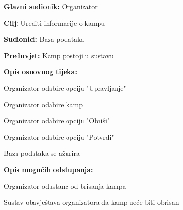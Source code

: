 					\noindent {}
					\begin{packed_item}
						
						\item \textbf{Glavni sudionik: } Organizator
						\item  \textbf{Cilj:} Urediti informacije o kampu
						\item  \textbf{Sudionici:} Baza podataka
						\item  \textbf{Preduvjet:} Kamp postoji u sustavu
						\item  \textbf{Opis osnovnog tijeka:}
						
						\item[] \begin{packed_enum}
							
							\item Organizator odabire opciju "Upravljanje"
							\item Organizator odabire kamp
							\item Organizator odabire opciju "Obriši"
							\item Organizator odabire opciju "Potvrdi"
							\item Baza podataka se ažurira
						\end{packed_enum}
						
						\item  \textbf{Opis mogućih odstupanja:}
						
						\item[] \begin{packed_item}
							
							\item[3.a] Organizator odustane od brisanja kampa
							\item[] \begin{packed_enum}
								
								\item Sustav obavještava organizatora da kamp neće biti obrisan
								
							\end{packed_enum}
							
							
						\end{packed_item}
					
					\end{packed_item}
				
